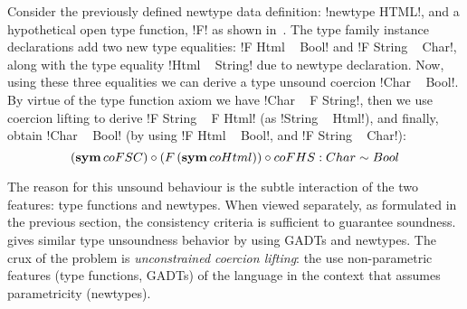 \documentclass[screen,nonacm,manuscript,review]{acmart} %
\begin{document}
Consider the previously defined newtype data definition:
!newtype HTML!, and a hypothetical open type
function, !F! as shown in~.
The type family instance declarations add
two new type equalities: !F Html ~ Bool! and !F String ~ Char!,
along with the type equality !Html ~ String! due to newtype declaration.
Now, using these three equalities we can derive a type
unsound coercion !Char ~ Bool!. By virtue of the type
function axiom we have !Char ~ F String!, then we use coercion
lifting to derive !F String ~ F Html! (as !String ~ Html!),
and finally, obtain !Char ~ Bool! (by using !F Html ~ Bool!, and !F String ~ Char!):
\[
{{(\textbf{sym}\,{c}oFSC)} \circ {(F\,(\textbf{sym}\,{coHtml}))}} \circ {coFHS} : Char \sim Bool
\]

The reason for this unsound behaviour is the subtle interaction of
the two features: type functions and newtypes.
When viewed separately, as formulated in the previous section,
the consistency criteria is sufficient to guarantee soundness.
\citet{weirich_generative_2011} gives similar type unsoundness behavior
by using GADTs and newtypes. The crux of the problem is
\emph{unconstrained coercion lifting}: the use non-parametric
features (type functions, GADTs) of the language in the context that assumes
parametricity (newtypes).
\end{document}
